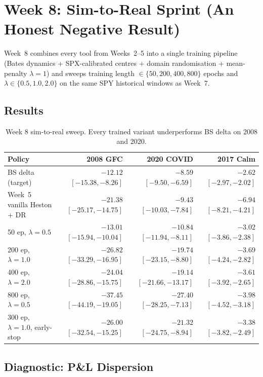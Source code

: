 \documentclass[11pt, a4paper]{article}
\begin{document}
\section{Week 8: Sim-to-Real Sprint (An Honest Negative Result)}
\label{sec:week8}

Week~8 combines every tool from Weeks~2--5 into a single training pipeline
(Bates dynamics + SPX-calibrated centres + domain randomisation + mean-penalty
$\lambda=1$) and sweeps training length $\in\{50,200,400,800\}$ epochs and
$\lambda \in \{0.5,1.0,2.0\}$ on the same SPY historical windows as Week~7.

\subsection{Results}

\begin{table}[h!]
\centering
\footnotesize
\begin{tabular}{lrrr}
\toprule
Policy & 2008 GFC & 2020 COVID & 2017 Calm \\
\midrule
BS delta (target)               & $-12.12$ $[-15.38,-8.26]$ & $-8.59$ $[-9.50,-6.59]$   & $-2.62$ $[-2.97,-2.02]$ \\
Week~5 vanilla Heston + DR      & $-21.38$ $[-25.17,-14.75]$ & $-9.43$ $[-10.03,-7.84]$  & $-6.94$ $[-8.21,-4.21]$ \\
50 ep, $\lambda=0.5$            & $-13.01$ $[-15.94,-10.04]$ & $-10.84$ $[-11.94,-8.11]$ & $-3.02$ $[-3.86,-2.38]$ \\
200 ep, $\lambda=1.0$           & $-26.82$ $[-33.29,-16.95]$ & $-19.74$ $[-23.15,-8.80]$ & $-3.69$ $[-4.24,-2.82]$ \\
400 ep, $\lambda=2.0$           & $-24.04$ $[-28.86,-15.75]$ & $-19.14$ $[-21.66,-13.17]$ & $-3.61$ $[-3.92,-2.65]$ \\
800 ep, $\lambda=0.5$           & $-37.45$ $[-44.19,-19.05]$ & $-27.40$ $[-28.25,-7.13]$ & $-3.98$ $[-4.52,-3.18]$ \\
300 ep, $\lambda=1.0$, early-stop & $-26.00$ $[-32.54,-15.25]$ & $-21.32$ $[-24.75,-8.94]$ & $-3.38$ $[-3.82,-2.49]$ \\
\bottomrule
\end{tabular}
\caption{Week 8 sim-to-real sweep. Every trained variant underperforms BS delta on 2008 and 2020.}
\label{tab:week8-sweep}
\end{table}

\subsection{Diagnostic: P\&L Dispersion}
\end{document}
